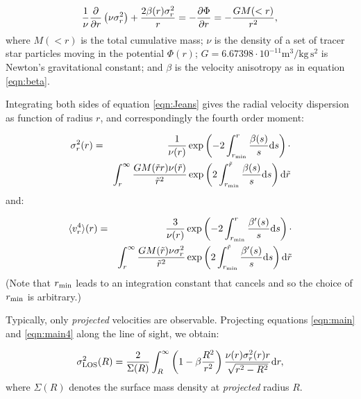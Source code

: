 \begin{equation}\label{eqn:Jeans}
    \frac{1}{\nu}\frac{\partial}{\partial r}\left(\nu\sigma_{r}^2\right) +
    \frac{2\beta(r)\sigma_{r}^2}{r} = -\frac{\partial \Phi}{\partial r} = -\frac{GM(<r)}{r^2},\\
\end{equation}
where $M(<r)$ is the total cumulative mass; $\nu$ is the density of a set of
tracer star particles moving in the potential $\Phi(r)$; $G =
6.67398\cdot10^{-11} \text{m}^3/\text{kg}\,\text{s}^2$ is Newton's gravitational
constant; and $\beta$ is the
velocity anisotropy as in equation \ref{eqn:beta}.

Integrating both sides of equation \ref{eqn:Jeans} gives the radial velocity
dispersion as function of radius $r$, and correspondingly the fourth order
moment:

\begin{eqnarray}
    \sigma_r^2(r) & = & \frac{1}{\nu(r)}\exp\left(-2\int_{r_{\rm min}}^{r}
        \frac{\beta(s)}{s}\text{d}s\right)\cdot \nonumber \\
   & & \int_r^\infty \frac{GM(\tilde{r}r)\nu(\tilde{r})}{\tilde{r}^2}
   \exp\left(2\int_{r_{\rm min}}^{\tilde{r}}\frac{\beta(s)}{s}\text{d}s\right)
   \text{d}\tilde{r}
\label{eqn:main}
\end{eqnarray}
and:

\begin{eqnarray}
    \langle{v_r^4}\rangle(r) & = & \frac{3}{\nu(r)}\exp\left(-2\int_{r_{\rm min}}^{r}
        \frac{\beta'(s)}{s}\text{d}s\right)\cdot \nonumber \\
   & & \int_r^\infty \frac{GM(\tilde{r})\nu\sigma_r^2}{\tilde{r}^2}
   \exp\left(2\int_{r_{\rm min}}^{\tilde{r}}\frac{\beta'(s)}{s}\text{d}s\right)
   \text{d}\tilde{r}
\label{eqn:main4}
\end{eqnarray}
(Note that $r_{\rm min}$ leads to an integration constant that cancels and so
the choice of $r_{\rm min}$ is arbitrary.)

Typically, only {\it projected} velocities are observable. Projecting equations
\ref{eqn:main} and \ref{eqn:main4} along the line of sight, we obtain:

\begin{equation}
    \sigma_{\text{LOS}}^2(R) = \frac{2}{\Sigma(R)}\int_R^\infty \left(1-\beta\frac{R^2}{r^2}\right)
    \frac{\nu(r)\sigma_r^2(r) r}{\sqrt{r^2-R^2}}\text{d}r,
\label{eqn:LOS}
\end{equation}
where $\Sigma(R)$ denotes the surface mass density at {\it projected} radius
$R$.

